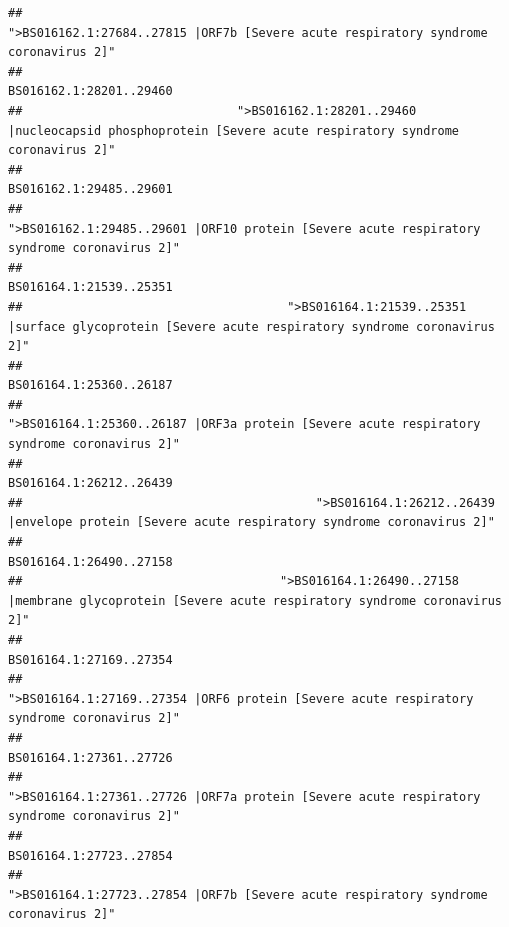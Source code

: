 \documentclass[
]{article}
\begin{document}
\begin{verbatim}
##                                                    ">BS016162.1:27684..27815 |ORF7b [Severe acute respiratory syndrome coronavirus 2]" 
##                                                                                                                BS016162.1:28201..29460 
##                              ">BS016162.1:28201..29460 |nucleocapsid phosphoprotein [Severe acute respiratory syndrome coronavirus 2]" 
##                                                                                                                BS016162.1:29485..29601 
##                                            ">BS016162.1:29485..29601 |ORF10 protein [Severe acute respiratory syndrome coronavirus 2]" 
##                                                                                                                BS016164.1:21539..25351 
##                                     ">BS016164.1:21539..25351 |surface glycoprotein [Severe acute respiratory syndrome coronavirus 2]" 
##                                                                                                                BS016164.1:25360..26187 
##                                            ">BS016164.1:25360..26187 |ORF3a protein [Severe acute respiratory syndrome coronavirus 2]" 
##                                                                                                                BS016164.1:26212..26439 
##                                         ">BS016164.1:26212..26439 |envelope protein [Severe acute respiratory syndrome coronavirus 2]" 
##                                                                                                                BS016164.1:26490..27158 
##                                    ">BS016164.1:26490..27158 |membrane glycoprotein [Severe acute respiratory syndrome coronavirus 2]" 
##                                                                                                                BS016164.1:27169..27354 
##                                             ">BS016164.1:27169..27354 |ORF6 protein [Severe acute respiratory syndrome coronavirus 2]" 
##                                                                                                                BS016164.1:27361..27726 
##                                            ">BS016164.1:27361..27726 |ORF7a protein [Severe acute respiratory syndrome coronavirus 2]" 
##                                                                                                                BS016164.1:27723..27854 
##                                                    ">BS016164.1:27723..27854 |ORF7b [Severe acute respiratory syndrome coronavirus 2]" 

\end{verbatim}
\end{document}
